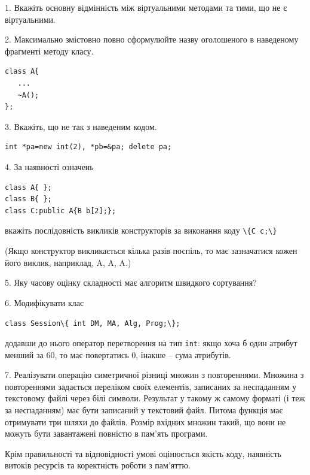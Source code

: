 \documentclass[12pt, ukrainian]{article}
\def\code#1{\Verb!#1!}
\begin{document}
{%
1. Вкажіть основну відмінність між віртуальними методами та тими, що не є віртуальними.%
\par
\vspace{2mm}
2. Максимально змістовно повно сформулюйте назву оголошеного в наведеному фрагменті методу класу.
\vspace{-3mm}
\begin{verbatim}class A{
   ...
   ~A();
};\end{verbatim}
\vspace{-3mm}
\par
\vspace{2mm}
3. Вкажіть, що не так з наведеним кодом.
\vspace{-3mm}
\begin{verbatim}int *pa=new int(2), *pb=&pa; delete pa;\end{verbatim}
\vspace{-3mm}
\par
\vspace{2mm}
4. За наявності означень
\vspace{-3mm}
\begin{verbatim}
class A{ };
class B{ };
class C:public A{B b[2];};\end{verbatim}
\vspace{-3mm}
вкажіть послідовність викликів конструкторів за виконання коду \code{\{C c;\}} 

(Якщо конструктор викликається кілька разів поспіль, то має зазначатися кожен його виклик, наприклад, A, A, A.)

\vspace{2mm}
5. Яку часову оцінку складності має алгоритм швидкого сортування?
\par
\vspace{2mm}
6. Модифікувати клас 

\qquad\code{class Session\{ int DM, MA, Alg, Prog;\};} 


додавши до нього оператор перетворення на тип \code{int}: якщо хоча б один атрибут менший за 60, то має повертатись 0, інакше -- сума атрибутів.%
\par
\vspace{2mm}
7. 
Реалізувати операцію симетричної різниці множин з повтореннями. Множина з повтореннями задається переліком своїх елементів, записаних за неспаданням у текстовому файлі через білі символи. Результат у такому ж самому форматі (і теж за неспаданням) має бути записаний у текстовий файл. Питома функція має отримувати три шляхи до файлів. Розмір вхідних множин такий, що вони не можуть бути завантажені повністю в пам’ять програми.

Крім правильності та відповідності умові оцінюється якість коду, наявність витоків ресурсів та коректність роботи з пам'яттю. 

}
\end{document}
